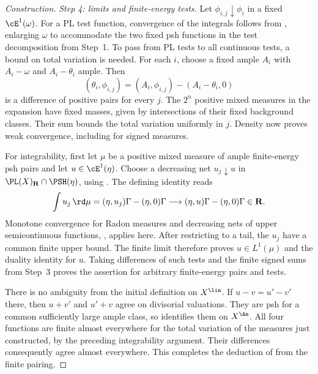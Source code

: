 \begin{proof}[Construction]
\emph{Step 4: limits and finite-energy tests.}
Let $\phi_{i,j}\downarrow\phi_i$ in a fixed $\cE^1(\omega)$.
For a PL test function, convergence of the integrals follows from
\cite[Theorem~7.14(iii)]{BJ22}, enlarging $\omega$ to accommodate the
two fixed psh functions in the test decomposition from Step~1.
To pass from PL tests to all continuous tests, a bound on total
variation is needed.  For each $i$, choose a fixed ample $A_i$ with
$A_i-\omega$ and $A_i-\theta_i$ ample.  Then
\[
 (\theta_i,\phi_{i,j})
   =(A_i,\phi_{i,j})-(A_i-\theta_i,0)
\]
is a difference of positive pairs for every $j$.  The $2^n$ positive
mixed measures in the expansion have fixed masses, given by
intersections of their fixed background classes.  Their sum bounds
the total variation uniformly in $j$.  Density now proves weak
convergence, including for signed measures.

For integrability, first let $\mu$ be a positive mixed measure of
ample finite-energy psh pairs and let $u\in\cE^1(\eta)$.
Choose a decreasing net $u_j\downarrow u$ in
$\PL(X)_{\mathbf R}\cap\PSH(\eta)$, using
\cite[Theorem~4.15]{BJ22}.
The defining identity reads
\[
 \int u_j\,\rd\mu
   =(\eta,u_j)\Gamma-(\eta,0)\Gamma
   \longrightarrow(\eta,u)\Gamma-(\eta,0)\Gamma\in\mathbf R.
\]
Monotone convergence for Radon measures and decreasing nets of upper
semicontinuous functions, \cite[Lemma~7.17]{BJ22}, applies here.
After restricting to a tail, the $u_j$ have a common finite upper
bound.  The finite limit therefore proves $u\in L^1(\mu)$ and the
duality identity for $u$.  Taking differences of such tests and the
finite signed sums from Step~3 proves the assertion for arbitrary
finite-energy pairs and tests.

There is no ambiguity from the initial definition on $X^{\lin}$.
If $u-v=u'-v'$ there, then $u+v'$ and $u'+v$ agree on divisorial
valuations.  They are psh for a common sufficiently large ample class,
so  identifies them on $X^{\An}$.
All four functions are finite almost everywhere for the total
variation of the measures just constructed, by the preceding
integrability argument.  Their differences consequently agree almost
everywhere.  This completes the deduction of
\cite[Proposition~7.19(iv)--(v)]{BJ22} from the finite pairing.
\end{proof}

